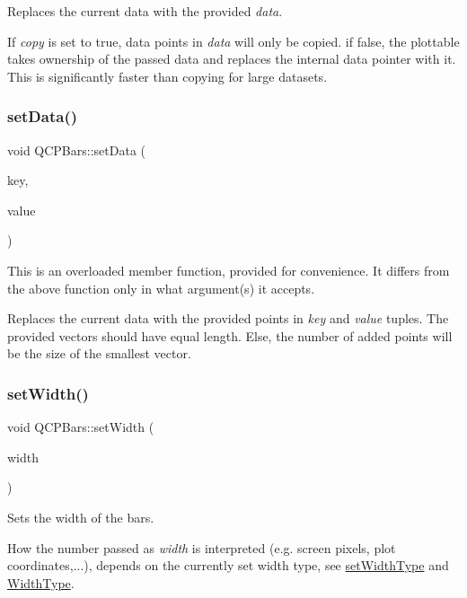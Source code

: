 Replaces the current data with the provided {\itshape data}.

If {\itshape copy} is set to true, data points in {\itshape data} will only be copied. if false, the plottable takes ownership of the passed data and replaces the internal data pointer with it. This is significantly faster than copying for large datasets. \mbox{\label{class_q_c_p_bars_a3efded5df4a82ecb201f7c28099fa2e5}} 
\subsubsection{\texorpdfstring{set\+Data()}{setData()}\hspace{0.1cm}{\footnotesize\ttfamily [2/2]}}
{\footnotesize\ttfamily void Q\+C\+P\+Bars\+::set\+Data (\begin{DoxyParamCaption}\item[{const Q\+Vector$<$ double $>$ \&}]{key,  }\item[{const Q\+Vector$<$ double $>$ \&}]{value }\end{DoxyParamCaption})}

This is an overloaded member function, provided for convenience. It differs from the above function only in what argument(s) it accepts.

Replaces the current data with the provided points in {\itshape key} and {\itshape value} tuples. The provided vectors should have equal length. Else, the number of added points will be the size of the smallest vector. \mbox{\label{class_q_c_p_bars_afec6116579d44d5b706e0fa5e5332507}} 
\subsubsection{\texorpdfstring{set\+Width()}{setWidth()}}
{\footnotesize\ttfamily void Q\+C\+P\+Bars\+::set\+Width (\begin{DoxyParamCaption}\item[{double}]{width }\end{DoxyParamCaption})}

Sets the width of the bars.

How the number passed as {\itshape width} is interpreted (e.\+g. screen pixels, plot coordinates,...), depends on the currently set width type, see \mbox{\hyperlink{class_q_c_p_bars_adcaa3b41281bb2c0f7949b341592fcc0}{set\+Width\+Type}} and \mbox{\hyperlink{class_q_c_p_bars_a65dbbf1ab41cbe993d71521096ed4649}{Width\+Type}}. \mbox{\label{class_q_c_p_bars_adcaa3b41281bb2c0f7949b341592fcc0}} 
